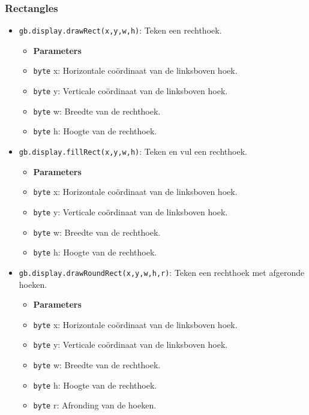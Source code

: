 \documentclass[a4paper,titlepage,12pt]{article}
\begin{document}
	\subsubsection{Rectangles}
	\begin{itemize}
		\item \texttt{gb.display.drawRect(x,y,w,h)}: Teken een rechthoek.
		\begin{itemize}
			\item [] \textbf{Parameters}
			\item \texttt{byte} x: Horizontale coördinaat van de linksboven hoek.
			\item \texttt{byte} y: Verticale coördinaat van de linksboven hoek.
			\item \texttt{byte} w: Breedte van de rechthoek.
			\item \texttt{byte} h: Hoogte van de rechthoek.
		\end{itemize}
	
		\item \texttt{gb.display.fillRect(x,y,w,h)}: Teken en vul een rechthoek.
		\begin{itemize}
			\item [] \textbf{Parameters}
			\item \texttt{byte} x: Horizontale coördinaat van de linksboven hoek.
			\item \texttt{byte} y: Verticale coördinaat van de linksboven hoek.
			\item \texttt{byte} w: Breedte van de rechthoek.
			\item \texttt{byte} h: Hoogte van de rechthoek.
		\end{itemize}
	
		\item \texttt{gb.display.drawRoundRect(x,y,w,h,r)}: Teken een rechthoek met afgeronde hoeken.
		\begin{itemize}
			\item [] \textbf{Parameters}
			\item \texttt{byte} x: Horizontale coördinaat van de linksboven hoek.
			\item \texttt{byte} y: Verticale coördinaat van de linksboven hoek.
			\item \texttt{byte} w: Breedte van de rechthoek.
			\item \texttt{byte} h: Hoogte van de rechthoek.
			\item \texttt{byte} r: Afronding van de hoeken.
		\end{itemize}
	

\end{itemize}
\end{document}

